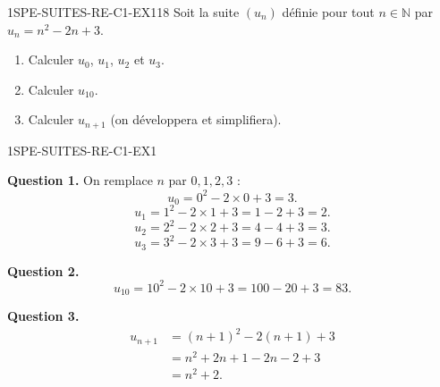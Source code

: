 


\begin{exercice}{1SPE-SUITES-RE-C1-EX1}{1}{8}
Soit la suite $(u_n)$ définie pour tout $n \in \mathbb{N}$ par $u_n = n^2 - 2n + 3$.
\begin{enumerate}
  \item Calculer $u_0$, $u_1$, $u_2$ et $u_3$.
  \item Calculer $u_{10}$.
  \item Calculer $u_{n+1}$ (on développera et simplifiera).
\end{enumerate}
\end{exercice}


\begin{corrige}{1SPE-SUITES-RE-C1-EX1}


\textbf{Question 1.} On remplace $n$ par $0, 1, 2, 3$ :
\[
u_0 = 0^2 - 2 \times 0 + 3 = 3.
\]
\[
u_1 = 1^2 - 2 \times 1 + 3 = 1 - 2 + 3 = 2.
\]
\[
u_2 = 2^2 - 2 \times 2 + 3 = 4 - 4 + 3 = 3.
\]
\[
u_3 = 3^2 - 2 \times 3 + 3 = 9 - 6 + 3 = 6.
\]


\textbf{Question 2.}
\[
u_{10} = 10^2 - 2 \times 10 + 3 = 100 - 20 + 3 = 83.
\]


\textbf{Question 3.}
\begin{align*}
u_{n+1} &= (n+1)^2 - 2(n+1) + 3 \\
         &= n^2 + 2n + 1 - 2n - 2 + 3 \\
         &= n^2 + 2.
\end{align*}

\end{corrige}

